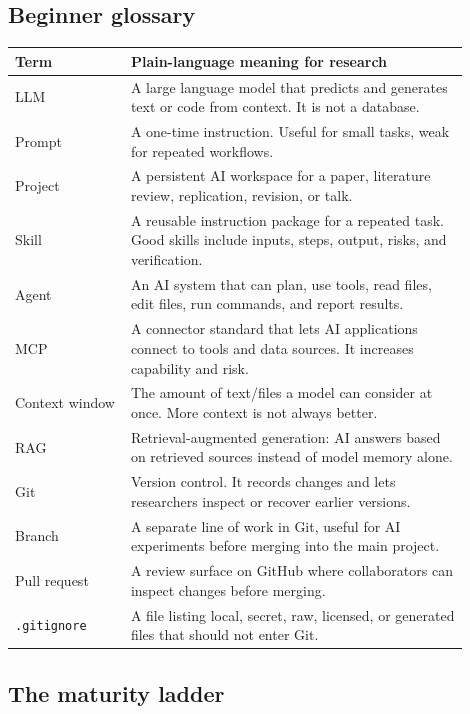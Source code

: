 \documentclass[11pt]{article}
\begin{document}
\subsection{Beginner glossary}

\begin{longtable}{p{0.23\linewidth}p{0.67\linewidth}}
\toprule
\textbf{Term} & \textbf{Plain-language meaning for research}\\
\midrule
LLM & A large language model that predicts and generates text or code from context. It is not a database.\\
Prompt & A one-time instruction. Useful for small tasks, weak for repeated workflows.\\
Project & A persistent AI workspace for a paper, literature review, replication, revision, or talk.\\
Skill & A reusable instruction package for a repeated task. Good skills include inputs, steps, output, risks, and verification.\\
Agent & An AI system that can plan, use tools, read files, edit files, run commands, and report results.\\
MCP & A connector standard that lets AI applications connect to tools and data sources. It increases capability and risk.\\
Context window & The amount of text/files a model can consider at once. More context is not always better.\\
RAG & Retrieval-augmented generation: AI answers based on retrieved sources instead of model memory alone.\\
Git & Version control. It records changes and lets researchers inspect or recover earlier versions.\\
Branch & A separate line of work in Git, useful for AI experiments before merging into the main project.\\
Pull request & A review surface on GitHub where collaborators can inspect changes before merging.\\
\texttt{.gitignore} & A file listing local, secret, raw, licensed, or generated files that should not enter Git.\\
\bottomrule
\end{longtable}

\subsection{The maturity ladder}
\end{document}
